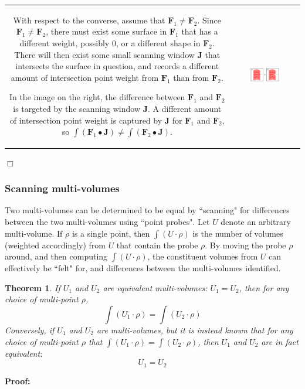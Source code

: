 \documentclass{book}
\newtheorem{thm}{Theorem}
\begin{document}
\begin{tabular}{cc}
\parbox{0.5\textwidth}{
With respect to the converse, assume that \(\mathbf{F}_1 \neq \mathbf{F}_2\). Since \(\mathbf{F}_1 \neq \mathbf{F}_2\), there must exist some surface in \(\mathbf{F}_1\) that has a different weight, possibly \(0\), or a different shape in \(\mathbf{F}_2\). There will then exist some small scanning window \(\mathbf{J}\) that intersects the surface in question, and records a different amount of intersection point weight from \(\mathbf{F}_1\) than from \(\mathbf{F}_2\).

In the image on the right, the difference between \(\mathbf{F}_1\) and \(\mathbf{F}_2\) is targeted by the scanning window \(\mathbf{J}\). A different amount of intersection point weight is captured by \(\mathbf{J}\) for \(\mathbf{F}_1\) and \(\mathbf{F}_2\), so \(\int (\mathbf{F}_1 \bullet \mathbf{J}) \neq \int (\mathbf{F}_2 \bullet \mathbf{J})\).
} & \parbox{0.5\textwidth}{
\includegraphics[width = 0.5\textwidth]{Point_totals/scanning_surfaces_using_paths}
}
\end{tabular}

\(\Box\)

\subsubsection{Scanning multi-volumes}

Two multi-volumes can be determined to be equal by ``scanning" for differences between the two multi-volumes using ``point probes". Let \(U\) denote an arbitrary multi-volume. If \(\rho\) is a single point, then \(\int (U \cdot \rho)\) is the number of volumes (weighted accordingly) from \(U\) that contain the probe \(\rho\). By moving the probe \(\rho\) around, and then computing \(\int (U \cdot \rho)\), the constituent volumes from \(U\) can effectively be ``felt" for, and differences between the multi-volumes identified.  

\begin{thm}
If \(U_1\) and \(U_2\) are equivalent multi-volumes: \(U_1 = U_2\), then for any choice of multi-point \(\rho\), 
\[\int (U_1 \cdot \rho) = \int (U_2 \cdot \rho)\]
Conversely, if \(U_1\) and \(U_2\) are multi-volumes, but it is instead known that for any choice of multi-point \(\rho\) that 
\(\int (U_1 \cdot \rho) = \int (U_2 \cdot \rho)\), then \(U_1\) and \(U_2\) are in fact equivalent:
\[U_1 = U_2\]  
\end{thm}
\textbf{Proof:}
\end{document}

